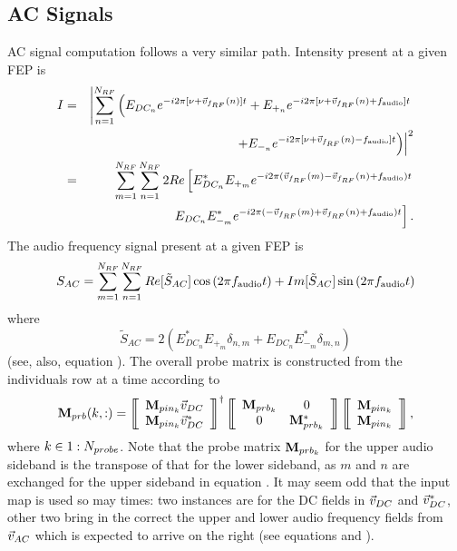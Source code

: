 \documentclass[12pt]{article}
\begin{document}
\subsection{AC Signals}
AC signal computation follows a very similar path. Intensity present at a given FEP is
\begin{eqnarray}
I &=& \left| \sum^{\Nrf}_{n = 1} \left( E_{DC_n} e^{-i 2 \pi [\nu + \vFrf(n)] t} + E_{+_n} e^{-i 2 \pi [\nu + \vFrf(n) + f_{\rm audio}] t} \right. \right. \nonumber \\
  & & \left. \left.+ E_{-_n} e^{-i 2 \pi [\nu + \vFrf(n) - f_{\rm audio}] t} \right) \right|^2 \\
 &=& \sum^{\Nrf}_{m = 1} \sum^{\Nrf}_{n = 1} 2 Re \left[ E_{DC_n}^{*} E_{+_m} e^{-i 2 \pi (\vFrf(m) - \vFrf(n) + f_{\rm audio} ) t} \right. \nonumber \\
 & & \left. E_{DC_n} E_{-_m}^{*} e^{-i 2 \pi (- \vFrf(m) + \vFrf(n) + f_{\rm audio} ) t} \right] .
\elabel{intensity}
\end{eqnarray}
The audio frequency signal present at a given FEP is
\begin{equation}
S_{AC} = \sum^{\Nrf}_{m = 1} \sum^{\Nrf}_{n = 1}
Re[ \tilde{S}_{AC} ] \cos{(2 \pi f_{\rm audio} t)} + Im[ \tilde{S}_{AC} ] \sin{(2 \pi f_{\rm audio} t)}
\elabel{sac}
\end{equation}
where
\begin{equation}
\tilde{S}_{AC} = 2 (E^*_{DC_n} E_{+_m} \delta_{n,m} + E_{DC_n} E^*_{-_m} \delta_{m,n})
\end{equation}
(see, also, equation ).
The overall probe matrix is constructed from the individuals row at a time according to
\begin{equation}
\mPrb(k,:) =
\matrixBegin{c}
\mPrbInn{k} \vDC \\
\mPrbInn{k} \vDC^{*}
\matrixEnd ^\dagger
\matrixBegin{cc}
\mPrbn{k} & 0 \\
0 & \mPrbn{k}^{*}
\matrixEnd
\matrixBegin{c}
\mPrbInn{k} \\
\mPrbInn{k}
\matrixEnd ,
\end{equation}
where $k \in 1:N_{probe}$.
Note that the probe matrix $\mathbf{M}_{prb_{k}}$ for the upper audio sideband is the transpose of that for the lower sideband, as $m$ and $n$ are exchanged for the upper sideband in equation .
It may seem odd that the input map is used so may times: two instances are for the DC fields in $\vec{v}_{DC}$ and $\vec{v}_{DC}^*$, other two bring in the correct the upper and lower audio frequency fields from $\vec{v}_{AC}$ which is expected to arrive on the right (see equations  and ).
\end{document}
